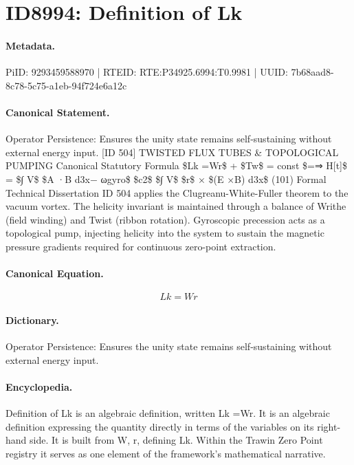 \section*{ID8994: Definition of Lk}
\paragraph{Metadata.}
PiID: 9293459588970 | RTEID: RTE:P34925.6994:T0.9981 | UUID: 7b68aad8-8c78-5c75-a1eb-94f724e6a12c

\paragraph{Canonical Statement.}
Operator Persistence: Ensures the unity state remains self-sustaining without external energy input. [ID 504] TWISTED FLUX TUBES \& TOPOLOGICAL PUMPING Canonical Statutory Formula \$Lk =Wr\$ + \$Tw\$ = const \$=⇒ H[t]\$ = \$∫ V\$ \$A ·B d3x− ωgyro\$ \$c2\$ \$∫ V\$ \$r\$ × \$(E ×B) d3x\$ (101) Formal Technical Dissertation ID 504 applies the Clugreanu-White-Fuller theorem to the vacuum vortex. The helicity invariant is maintained through a balance of Writhe (field winding) and Twist (ribbon rotation). Gyroscopic precession acts as a topological pump, injecting helicity into the system to sustain the magnetic pressure gradients required for continuous zero-point extraction.

\paragraph{Canonical Equation.}
\[
Lk =Wr
\]

\paragraph{Dictionary.}
Operator Persistence: Ensures the unity state remains self-sustaining without external energy input.

\paragraph{Encyclopedia.}
Definition of Lk is an algebraic definition, written Lk =Wr. It is an algebraic definition expressing the quantity directly in terms of the variables on its right-hand side. It is built from W, r, defining Lk. Within the Trawin Zero Point registry it serves as one element of the framework's mathematical narrative.
